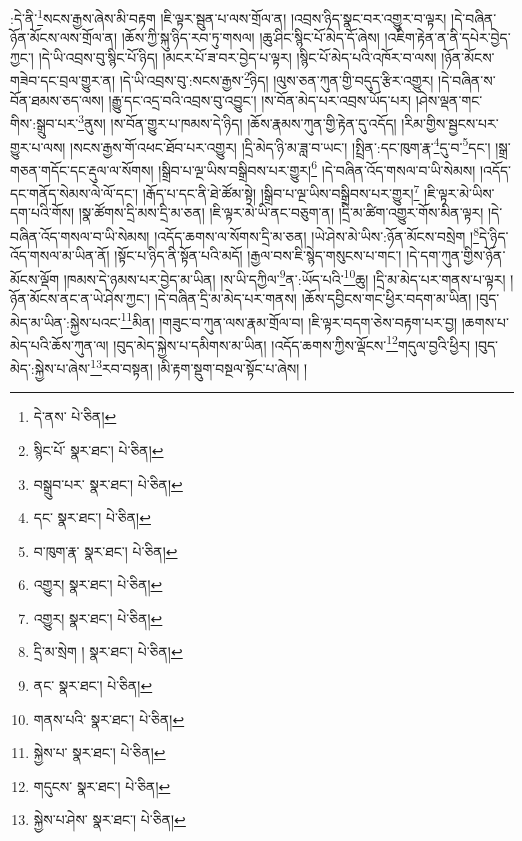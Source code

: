 :དེ་ནི་\footnote{དེ་ནས་  པེ་ཅིན། }སངས་རྒྱས་ཞེས་མི་བརྟག །ཇི་ལྟར་སྦུན་པ་ལས་གྲོལ་ན། །འབྲས་ཉིད་སྣང་བར་འགྱུར་བ་ལྟར། །དེ་བཞིན་ཉོན་མོངས་ལས་གྲོལ་ན། །ཆོས་ཀྱི་སྐུ་ཉིད་རབ་ཏུ་གསལ། །ཆུ་ཤིང་སྙིང་པོ་མེད་དོ་ཞེས། །འཇིག་རྟེན་ན་ནི་དཔེར་བྱེད་ཀྱང་། །དེ་ཡི་འབྲས་བུ་སྙིང་པོ་ཉིད། །མངར་པོ་ཟ་བར་བྱེད་པ་ལྟར། །སྙིང་པོ་མེད་པའི་འཁོར་བ་ལས། །ཉོན་མོངས་གཟེབ་དང་བྲལ་གྱུར་ན། །དེ་ཡི་འབྲས་བུ་:སངས་རྒྱས་\footnote{སྙིང་པོ་  སྣར་ཐང་།  པེ་ཅིན། }ཉིད། །ལུས་ཅན་ཀུན་གྱི་བདུད་རྩིར་འགྱུར། །དེ་བཞིན་ས་བོན་ཐམས་ཅད་ལས། །རྒྱུ་དང་འདྲ་བའི་འབྲས་བུ་འབྱུང་། །ས་བོན་མེད་པར་འབྲས་ཡོད་པར། །ཤེས་ལྡན་གང་གིས་:སྒྲུབ་པར་\footnote{བསྒྲུབ་པར་  སྣར་ཐང་།  པེ་ཅིན། }ནུས། །ས་བོན་གྱུར་པ་ཁམས་དེ་ཉིད། །ཆོས་རྣམས་ཀུན་གྱི་རྟེན་དུ་འདོད། །རིམ་གྱིས་སྦྱངས་པར་གྱུར་པ་ལས། །སངས་རྒྱས་གོ་འཕང་ཐོབ་པར་འགྱུར། །དྲི་མེད་ཉི་མ་ཟླ་བ་ཡང་། །སྤྲིན་:དང་ཁུག་རྣ་\footnote{དང་  སྣར་ཐང་།  པེ་ཅིན། }དུ་བ་\footnote{བ་ཁུག་རྣ་  སྣར་ཐང་།  པེ་ཅིན། }དང་། །སྒྲ་གཅན་གདོང་དང་རྡུལ་ལ་སོགས། །སྒྲིབ་པ་ལྔ་ཡིས་བསྒྲིབས་པར་གྱུར།\footnote{འགྱུར།  སྣར་ཐང་།  པེ་ཅིན། } །དེ་བཞིན་འོད་གསལ་བ་ཡི་སེམས། །འདོད་དང་གནོད་སེམས་ལེ་ལོ་དང་། །རྒོད་པ་དང་ནི་ཐེ་ཚོམ་སྟེ། །སྒྲིབ་པ་ལྔ་ཡིས་བསྒྲིབས་པར་གྱུར།\footnote{འགྱུར།  སྣར་ཐང་།  པེ་ཅིན། } །ཇི་ལྟར་མེ་ཡིས་དག་པའི་གོས། །སྣ་ཚོགས་དྲི་མས་དྲི་མ་ཅན། །ཇི་ལྟར་མེ་ཡི་ནང་བཅུག་ན། །དྲི་མ་ཚིག་འགྱུར་གོས་མིན་ལྟར། །དེ་བཞིན་འོད་གསལ་བ་ཡི་སེམས། །འདོད་ཆགས་ལ་སོགས་དྲི་མ་ཅན། །ཡེ་ཤེས་མེ་ཡིས་:ཉོན་མོངས་བསྲེག །\footnote{དྲི་མ་སྲེག །  སྣར་ཐང་།  པེ་ཅིན། }དེ་ཉིད་འོད་གསལ་མ་ཡིན་ནོ། །སྟོང་པ་ཉིད་ནི་སྟོན་པའི་མདོ། །རྒྱལ་བས་ཇི་སྙེད་གསུངས་པ་གང་། །དེ་དག་ཀུན་གྱིས་ཉོན་མོངས་ལྡོག །ཁམས་དེ་ཉམས་པར་བྱེད་མ་ཡིན། །ས་ཡི་དཀྱིལ་\footnote{ནང་  སྣར་ཐང་།  པེ་ཅིན། }ན་:ཡོད་པའི་\footnote{གནས་པའི་  སྣར་ཐང་།  པེ་ཅིན། }ཆུ། །དྲི་མ་མེད་པར་གནས་པ་ལྟར། །ཉོན་མོངས་ནང་ན་ཡེ་ཤེས་ཀྱང་། །དེ་བཞིན་དྲི་མ་མེད་པར་གནས། །ཆོས་དབྱིངས་གང་ཕྱིར་བདག་མ་ཡིན། །བུད་མེད་མ་ཡིན་:སྐྱེས་པའང་\footnote{སྐྱེས་པ་  སྣར་ཐང་།  པེ་ཅིན། }མིན། །གཟུང་བ་ཀུན་ལས་རྣམ་གྲོལ་བ། །ཇི་ལྟར་བདག་ཅེས་བརྟག་པར་བྱ། །ཆགས་པ་མེད་པའི་ཆོས་ཀུན་ལ། །བུད་མེད་སྐྱེས་པ་དམིགས་མ་ཡིན། །འདོད་ཆགས་ཀྱིས་ལྡོངས་\footnote{གདུངས་  སྣར་ཐང་།  པེ་ཅིན། }གདུལ་བྱའི་ཕྱིར། །བུད་མེད་:སྐྱེས་པ་ཞེས་\footnote{སྐྱེས་པ་ཤེས་  སྣར་ཐང་།  པེ་ཅིན། }རབ་བསྟན། །མི་རྟག་སྡུག་བསྔལ་སྟོང་པ་ཞེས། །
